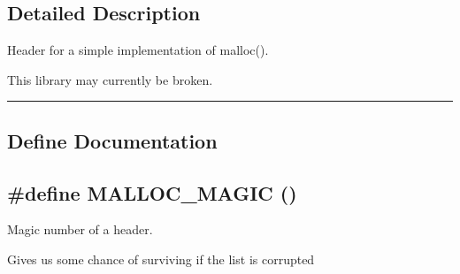\subsection*{Detailed Description}
Header for a simple implementation of malloc().

This library may currently be broken. \vspace{0.4cm}\hrule\vspace{0.2cm}
\subsection*{Define Documentation}
\label{malloc.h_a2}
\subsection{\setlength{\rightskip}{0pt plus 5cm}\#define MALLOC\_\-MAGIC ()}

Magic number of a header.

Gives us some chance of surviving if the list is corrupted 